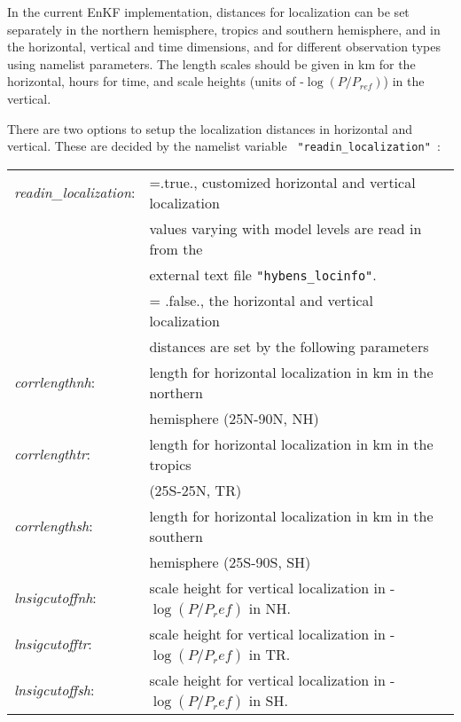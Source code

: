 In the current EnKF implementation, distances for localization can be set separately in the northern hemisphere, tropics and southern hemisphere, and in the horizontal, vertical and time dimensions, and for different observation types using namelist parameters. The length scales should be given in km for the horizontal, hours for time, and scale heights (units of -$\log(P/P_{ref})$) in the vertical.

There are two options to setup the localization distances in horizontal and vertical. These are decided by the namelist variable 
\verb| "readin_localization" |:
\begin{table}[htbp]
\centering
\begin{tabular}{ll}

\textit{readin\_localization}: &  =.true., customized horizontal and vertical localization\\
                                &  values varying with model levels are read in from the \\
                                & external text file \verb|"hybens_locinfo"|. \\
                               
                                & = .false., the horizontal and vertical localization \\
                                 & distances are set by the following parameters \\
                                 
\textit{corrlengthnh}:  & length for horizontal localization in km in the northern \\
                        & hemisphere (25N-90N, NH)  \\
                        
\textit{corrlengthtr}:  & length for horizontal localization in km in the tropics \\
                      & (25S-25N, TR)  \\
                     
\textit{corrlengthsh}:  & length for horizontal localization in km in the southern \\
                       & hemisphere (25S-90S, SH) \\

\textit{lnsigcutoffnh}:  & scale height for vertical localization in -$\log(P/P_ref)$ in NH. \\

\textit{lnsigcutofftr}: & scale height for vertical localization in -$\log(P/ P_ref)$ in TR.  \\

\textit{lnsigcutoffsh}: & scale height for vertical localization in -$\log(P/P_ref)$ in SH.  \\
          
\end{tabular}
\end{table}


